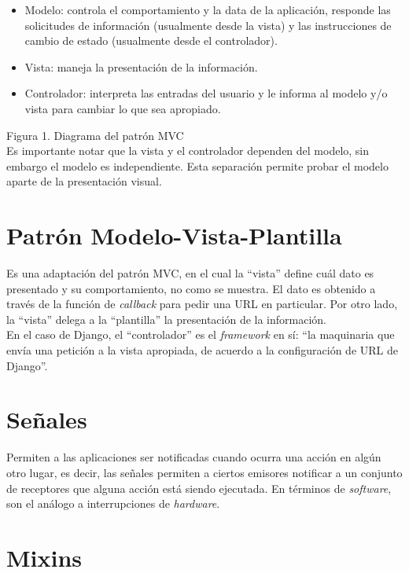 \begin{itemize}
    \item Modelo: controla el comportamiento y la data de la aplicación, responde las solicitudes de información (usualmente desde la vista) y las instrucciones de cambio de estado (usualmente desde el controlador).
    \item Vista: maneja la presentación de la información.
    \item Controlador: interpreta las entradas del usuario y le informa al modelo y/o vista para cambiar lo que sea apropiado.\cite{MVC1}
\end{itemize}



Figura 1. Diagrama del patrón MVC\\

Es importante notar que la vista y el controlador dependen del modelo, sin embargo el modelo es independiente. Esta separación permite probar el modelo aparte de la presentación visual. 

\section{Patrón Modelo-Vista-Plantilla}

Es una adaptación del patrón MVC, en el cual la “vista” define cuál dato es presentado y su comportamiento, no como se muestra. El dato es obtenido a través de la función de \textit{callback} para pedir una URL en particular. Por otro lado, la “vista” delega a la “plantilla”  la presentación de la información.\\

En el caso de Django, el “controlador” es el \textit{framework} en sí: “la maquinaria que envía una petición a la vista apropiada, de acuerdo a la configuración de URL de Django”. \cite{MVT}

\section{Señales}

Permiten a las aplicaciones ser notificadas cuando ocurra una acción en algún otro lugar, es decir, las señales permiten a ciertos emisores notificar a un conjunto de receptores que alguna acción está siendo ejecutada. \cite{Signals} En términos de \textit{software}, son el análogo a interrupciones de \textit{hardware}. \cite{Senales}

\section{Mixins}

